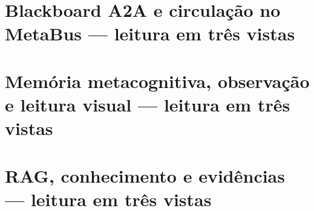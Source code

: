 \clearpage\section{Blackboard A2A e circulação no MetaBus — leitura em três vistas}\label{arch:AR03}



\clearpage\section{Memória metacognitiva, observação e leitura visual — leitura em três vistas}\label{arch:AR06}



\clearpage\section{RAG, conhecimento e evidências — leitura em três vistas}\label{arch:AR07}





